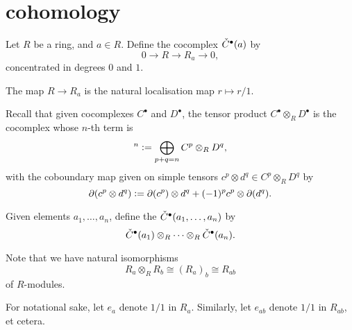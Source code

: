\section{\Cech cohomology}


\begin{defn}
	Let $R$ be a ring, and $a \in R$. Define the cocomplex $\check{C}^{\bullet}(a)$ by
	\begin{equation*} 
		0 \to R \to R_{a} \to 0,
	\end{equation*}
	concentrated in degrees $0$ and $1$.
\end{defn}



The map $R \to R_{a}$ is the natural localisation map $r \mapsto r/1$. 

Recall that given cocomplexes $C^{\bullet}$ and $D^{\bullet}$, the tensor product $C^{\bullet} \otimes_{R} D^{\bullet}$ is the cocomplex whose $n$-th term is
\begin{equation*} 
	[C^{\bullet} \otimes_{R} D^{\bullet}]^{n} \vcentcolon= \bigoplus_{p + q = n} C^{p} \otimes_{R} D^{q},
\end{equation*}
with the coboundary map given on simple tensors $c^{p} \otimes d^{q} \in C^{p} \otimes_{R} D^{q}$ by
\begin{equation*} 
	\partial(c^{p} \otimes d^{q}) \vcentcolon= \partial(c^{p}) \otimes d^{q} + (-1)^{p} c^{p} \otimes \partial(d^{q}).
\end{equation*}

\begin{defn}
	Given elements $a_{1}, \ldots, a_{n}$, define the  $\check{C}^{\bullet}(a_{1}, \ldots, a_{n})$ by
	\begin{equation*} 
		\check{C}^{\bullet}(a_{1}) \otimes_{R} \cdots \otimes_{R} \check{C}^{\bullet}(a_{n}).
	\end{equation*}
\end{defn}

Note that we have natural isomorphisms 
\begin{equation*} 
	R_{a} \otimes_{R} R_{b} \cong (R_{a})_{b} \cong R_{ab}
\end{equation*} 
of $R$-modules. 

For notational sake, let $e_{a}$ denote $1/1$ in $R_{a}$. Similarly, let $e_{ab}$ denote $1/1$ in $R_{ab}$, et cetera.

